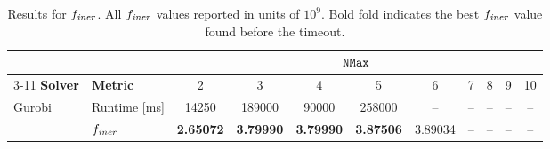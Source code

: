 \begin{landscape}
	
	\begin{table}[p]
		\centering
		\small
		\caption{Results for $f_\mathit{iner}$. All $f_\mathit{iner}$ values reported in units of $10^9$. Bold fold indicates the best $f_\mathit{iner}$ value found before the timeout.}
		\label{tab:solvercomparison_momentobj}
		\renewcommand{\arraystretch}{1.2}
		
		\begin{tabular}{p{1.5cm}p{1.5cm}ccccccccc}
			\toprule
			\multicolumn{2}{c}{} & \multicolumn{9}{c}{$\mathtt{NMax}$} \\
			\cmidrule(lr){3-11}
			\textbf{Solver} & \textbf{Metric} & 2 & 3 & 4 & 5 & 6 & 7 & 8 & 9 & 10 \\
			\midrule
			Gurobi & Runtime [ms]
			& 14250 & 189000 & 90000 & 258000 & -- & -- & -- & -- & -- \\
			& $f_\mathit{iner}$
			& \textbf{2.65072}
			& \textbf{3.79990}
			& \textbf{3.79990}
			& \textbf{3.87506}
			& 3.89034
			& --
			& --
			& --
			& -- \\
			\bottomrule
		\end{tabular}
	\end{table}
	
\end{landscape}

